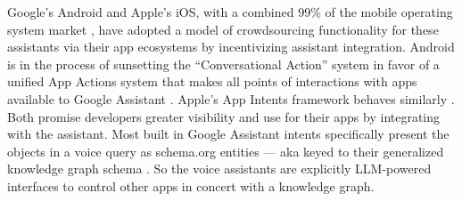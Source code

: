 Google's Android and Apple's iOS, with a combined 99\% of the mobile
operating system market \cite{statistaGlobalMobileOS2023} , have
adopted a model of crowdsourcing functionality for these assistants via
their app ecosystems by incentivizing assistant integration. Android is in the process of
sunsetting the ``Conversational Action'' system in favor of a unified
App Actions system that makes all points of interactions with apps
available to Google Assistant \cite{nathensonHelpingDevelopersCreate2022} . Apple's App Intents framework
behaves similarly \cite{appledeveloperdocumentationAppIntents} .
Both promise developers greater visibility and use for their apps by
integrating with the assistant. Most built in Google Assistant intents
specifically present the objects in a voice query as schema.org entities
--- aka keyed to their generalized knowledge graph schema \cite{androiddeveloperdocumentationBuildAppActions} . So the voice
assistants are explicitly LLM-powered interfaces to control other apps
in concert with a knowledge graph.


